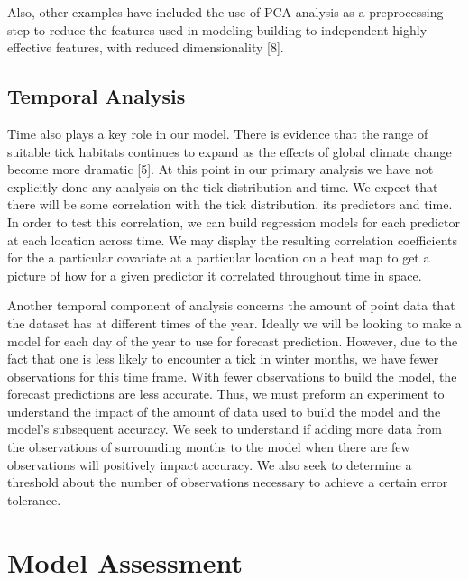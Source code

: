 \noindent Also, other examples have included the use of PCA analysis as a preprocessing step to reduce the features used in modeling building to independent highly effective features, with reduced dimensionality [8].   \newline


\subsection{Temporal Analysis}
Time also plays a key role in our model. There is evidence that the range of suitable tick habitats continues to expand as the effects of global climate change become more dramatic [5]. At this point in our primary analysis we have not explicitly done any analysis on the tick distribution and time. We expect that there will be some correlation with the tick distribution, its predictors and time. In order to test this correlation, we can build regression models for each predictor at each location across time. We may display the resulting correlation coefficients for the a particular covariate at a particular location on a heat map to get a picture of how for a given predictor it correlated throughout time in space.  \newline

\noindent Another temporal component of analysis concerns the amount of point data that the dataset has at different times of the year. Ideally we will be looking to make a model for each day of the year to use for forecast prediction. However, due to the fact that one is less likely to encounter a tick in winter months, we have fewer observations for this time frame. With fewer observations to build the model, the forecast predictions are less accurate.  Thus, we must preform an experiment to understand the impact of the amount of data used to build the model and the model's subsequent accuracy. We seek to understand if adding more data from the observations of surrounding months to the model when there are few observations will positively impact accuracy. We also seek to determine a threshold about the number of observations necessary to achieve a certain error tolerance. \newline






\section{Model Assessment }


